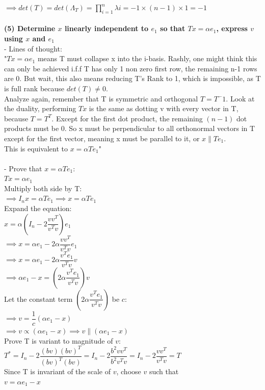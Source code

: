 \documentclass{article}
\begin{document}
$\implies det(T)=det(\Lambda_T)=\prod_{i=1}^n \lambda i = -1 \times (n-1) \times 1 = -1$ \\ \\
\newpage
\textbf{(5) Determine $x$ linearly independent to $e_1$ so that $Tx = \alpha e_1$, express $v$ using $x$ and $e_1$} \\
- Lines of thought: \\
"$Tx = \alpha e_1$ means T must collapse x into the i-basis. Rashly, one might think this can only be achieved i.f.f T has only 1 non zero first row, the remaining n-1 rows are 0. But wait, this also means reducing T's Rank to 1, which is impossible, as T is full rank because $det(T) \neq 0$. \\
Analyze again, remember that T is symmetric and orthogonal $T=T^-1$. Look at the duality, performing $Tx$ is the same as dotting v with every vector in T, because $T=T^T$. Except for the first dot product, the remaining $(n-1)$ dot products must be 0. So x must be perpendicular to all orthonormal vectors in T except for the first vector, meaning x must be parallel to it, or $x \parallel Te_1$. \\
This is equivalent to $ x =\alpha Te_1$"\\\\
- Prove that $ x =\alpha Te_1$:\\
$Tx=\alpha e_1$ \\
Multiply both side by T: \\
$\implies I_n x = \alpha Te_1 \implies x = \alpha Te_1$ \\
Expand the equation: \\
$x = \alpha \left( I_n - 2\dfrac{vv^T}{v^Tv} \right)e_1$ \\
$\implies x = \alpha e_1 - 2\alpha \dfrac{vv^T}{v^Tv} e_1$ \\
$\implies x = \alpha e_1 - 2\alpha  \dfrac{v^Te_1}{v^Tv}v $ \\ 
$\implies \alpha e_1 - x = \left( 2\alpha \dfrac{v^Te_1}{v^Tv} \right)v$ \\

Let the constant term $\left( 2\alpha \dfrac{v^Te_1}{v^Tv} \right)$ be $c$: \\
$\implies v = \dfrac{1}{c}(\alpha e_1 - x)$ \\
$\implies v \propto (\alpha e_1 - x) \implies v \parallel (\alpha e_1 - x)$ \\
\newpage
Prove  T is variant to magnitude of $v$: \\
$T^*=I_n - 2\dfrac{(bv)(bv)^T}{(bv)^T(bv)}=I_n-2\dfrac{b^2vv^T}{b^2v^Tv}=I_n-2\dfrac{vv^T}{v^Tv}=T$ \\
Since T is invariant of the scale of $v$, choose $v$ such that \\ $v=\alpha e_1 -x$ \\
\end{document}
